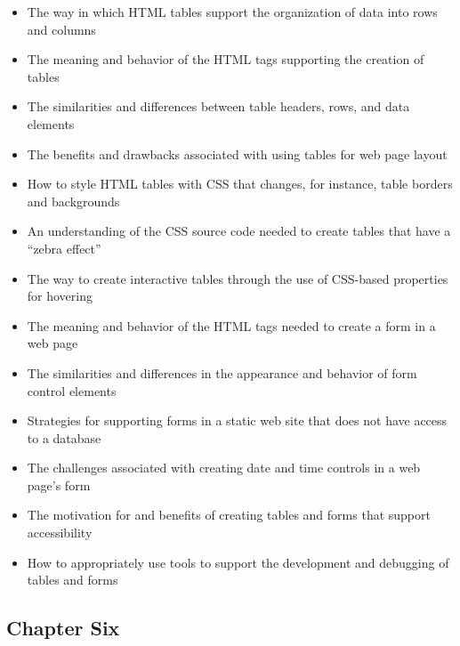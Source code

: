 \documentclass[11pt]{article}
\begin{document}
\begin{itemize}

  \itemsep 0in

  \item The way in which HTML tables support the organization of data into rows
    and columns
  \item The meaning and behavior of the HTML tags supporting the creation of
    tables
  \item The similarities and differences between table headers, rows, and data
    elements
  \item The benefits and drawbacks associated with using tables for web page
    layout
  \item How to style HTML tables with CSS that changes, for instance, table
    borders and backgrounds
  \item An understanding of the CSS source code needed to create tables that
    have a ``zebra effect''
  \item The way to create interactive tables through the use of CSS-based
    properties for hovering
  \item The meaning and behavior of the HTML tags needed to create a form in a
    web page
  \item The similarities and differences in the appearance and behavior of form
    control elements
  \item Strategies for supporting forms in a static web site that does not have
    access to a database
  \item The challenges associated with creating date and time controls in a web
    page's form
  \item The motivation for and benefits of creating tables and forms that
    support accessibility
  \item How to appropriately use tools to support the development and
    debugging of tables and forms

\end{itemize}

\vspace*{-.2in}
\subsection*{Chapter Six}
\end{document}
